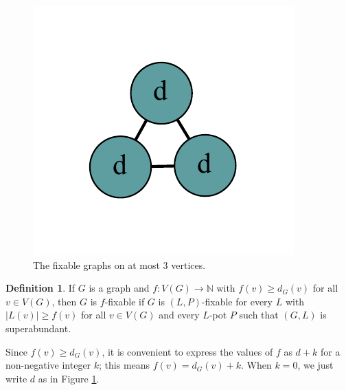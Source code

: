 \documentclass[12pt]{article}
\theoremstyle{plain}
\theoremstyle{definition}
\newtheorem{defn}{Definition}
\theoremstyle{remark}
\newcommand{\IN}{\mathbb{N}}
\newcommand{\func}[3]{#1\colon #2 \rightarrow #3}
\begin{document}
\begin{figure}[htb]
		\includegraphics[scale=0.5]{Superabundance/all/111[2,2,2].pdf}
		\caption{The fixable graphs on at most 3 vertices.}
		\label{fig:fixable3}
	\end{figure}
	
	\begin{defn}
		If $G$ is a graph and $\func{f}{V(G)}{\IN}$ with $f(v) \ge d_G(v)$ for all $v \in V(G)$, then $G$ is $f$-fixable if $G$ is $(L, P)$-fixable for every $L$ with $|L(v)| \ge f(v)$ for all $v \in V(G)$ and every $L$-pot $P$ such that $(G,L)$ is superabundant.
	\end{defn}
	
	Since $f(v) \ge d_G(v)$, it is convenient to express the values of $f$ as $d+k$ for a non-negative integer $k$; this means $f(v) = d_G(v) + k$.  When $k=0$, we just write $d$ as in Figure \ref{fig:fixable3}.  
	
\end{document}
